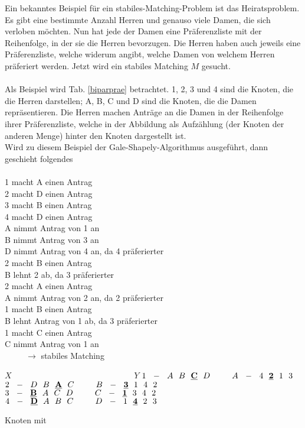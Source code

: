 \noindent Ein bekanntes Beispiel für ein stabiles-Matching-Problem ist das Heiratsproblem. Es gibt eine bestimmte Anzahl Herren und genauso viele Damen, die sich verloben möchten. Nun hat jede der Damen eine Präferenzliste mit der Reihenfolge, in der sie die Herren bevorzugen. Die Herren haben auch jeweils eine Präferenzliste, welche widerum angibt, welche Damen von welchem Herren präferiert werden. Jetzt wird ein stabiles Matching $M$ gesucht.
\\ \phantom{a}
\\ Als Beispiel wird Tab. \ref{biparprae} betrachtet. 1, 2, 3 und 4 sind die Knoten, die die Herren darstellen; A, B, C und D sind die Knoten, die die Damen repräsentieren. Die Herren machen Anträge an die Damen in der Reihenfolge ihrer Präferenzliste, welche in der Abbildung als Aufzählung (der Knoten der anderen Menge) hinter den Knoten dargestellt ist.
\\ Wird zu diesem Beispiel der Gale-Shapely-Algorithmus ausgeführt, dann geschieht folgendes
\\ \phantom{A}
\\ 1 macht A einen Antrag
\\ 2 macht D einen Antrag
\\ 3 macht B einen Antrag
\\ 4 macht D einen Antrag
\\ \phantom{esss} A nimmt Antrag von 1 an
\\ \phantom{esss} B nimmt Antrag von 3 an
\\ \phantom{esss} D nimmt Antrag von 4 an, da 4 präferierter
\\ 2 macht B einen Antrag
\\ \phantom{esss} B lehnt 2 ab, da 3 präferierter
\\ 2 macht A einen Antrag
\\ \phantom{esss} A nimmt Antrag von 2 an, da 2 präferierter
\\ 1 macht B einen Antrag
\\ \phantom{esss} B lehnt Antrag von 1 ab, da 3 präferierter
\\ 1 macht C einen Antrag
\\ \phantom{esss} C nimmt Antrag von 1 an
\\ \ \ \ \ \ $\rightarrow$ stabiles Matching

\begin{table}[ht]
\centering
$X$ \ \ \ \ \ \ \ \ \ \ \ \ \ \ \ \ \ \ \ \ \ \ \ \ \ \ \ \ \ $Y$
$1 \ \ - \ \ A \ \ B \ \ \wichtig{\underline{C}} \ \ D \ \ \ \ \ \ \ \ A \ \ - \ \ 4 \ \ \wichtig{\underline{2}} \ \ 1 \ \ 3$
\\ $2 \ \ - \ \ D \ \ B \ \ \wichtig{\underline{A}} \ \ C \ \ \ \ \ \ \ \ B \ \ - \ \ \wichtig{\underline{3}} \ \ 1 \ \ 4 \ \ 2$
\\ $3 \ \ - \ \ \wichtig{\underline{B}} \ \ A \ \ C \ \ D \ \ \ \ \ \ \ \ C \ \ - \ \ \wichtig{\underline{1}} \ \ 3 \ \ 4 \ \ 2$
\\ $4 \ \ - \ \ \wichtig{\underline{D}} \ \ A \ \ B \ \ C \ \ \ \ \ \ \ \ D \ \ - \ \ 1 \ \ \wichtig{\underline{4}} \ \ 2 \ \ 3$
\caption{Knoten mit }
\label{bimat}
\end{table} 


